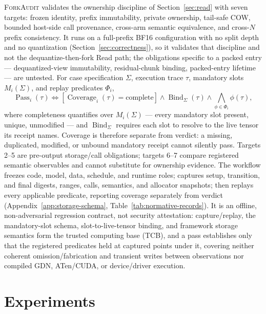 \documentclass{article}
\newcommand{\method}{\textsc{ForkAudit}}
\begin{document}
\method{} validates the ownership discipline of Section~\ref{sec:read} with
seven targets: frozen identity, prefix immutability, private ownership,
tail-safe COW, bounded host-side call provenance, cross-arm semantic
equivalence, and cross-\(N\) prefix consistency. It runs on a full-prefix BF16
configuration with no split depth and no quantization
(Section~\ref{sec:correctness}), so it validates that discipline and not the
dequantize-then-fork Read path; the obligations specific to a packed entry ---
dequantized-view immutability, residual-chunk binding, packed-entry lifetime
--- are untested.
For case specification \(\Sigma\), execution trace \(\tau\), mandatory slots
\(M_i(\Sigma)\), and replay predicates \(\Phi_i\),
\begin{equation}
  \operatorname{Pass}_i(\tau)\Longleftrightarrow
  [\operatorname{Coverage}_i(\tau)=\mathrm{complete}]
  \wedge\operatorname{Bind}_{\Sigma}(\tau)
  \wedge\bigwedge_{\phi\in\Phi_i}\phi(\tau),
\end{equation}
where completeness quantifies over \(M_i(\Sigma)\) --- every mandatory slot
present, unique, unmodified --- and \(\operatorname{Bind}_{\Sigma}\) requires
each slot to resolve to the live tensor its receipt names.
Coverage is therefore separate from verdict: a missing, duplicated, modified,
or unbound mandatory receipt cannot silently pass.  Targets 2--5 are pre-output
storage/call obligations; targets 6--7 compare registered semantic observables
and cannot substitute for ownership evidence.  The workflow freezes code,
model, data, schedule, and runtime roles; captures setup, transition, and final
digests, ranges, calls, semantics, and allocator snapshots; then replays every
applicable predicate, reporting coverage separately from verdict
(Appendix~\ref{app:storage-schema}, Table~\ref{tab:normative-records}).  It is
an offline, non-adversarial regression contract, not security attestation:
capture/replay, the mandatory-slot schema, slot-to-live-tensor binding, and
framework storage semantics form the trusted computing base (TCB), and a pass
establishes only that the registered predicates held at captured points under
it, covering neither coherent omission/fabrication and transient writes between
observations nor compiled GDN, ATen/CUDA, or device/driver execution.

\section{Experiments}
\label{sec:experiments}
\label{sec:protocol}
\end{document}
